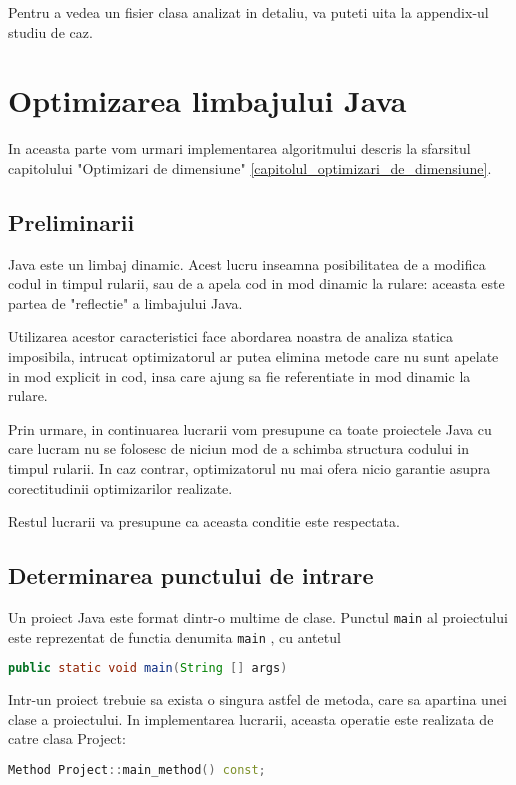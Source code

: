 Pentru a vedea un fisier clasa analizat in detaliu, va puteti
uita la appendix-ul studiu de caz.


\section{Optimizarea limbajului Java}

In aceasta parte vom urmari implementarea algoritmului descris la sfarsitul
capitolului "Optimizari de dimensiune" \ref{capitolul_optimizari_de_dimensiune}.

\subsection{Preliminarii}

Java este un limbaj dinamic. Acest lucru inseamna posibilitatea de a modifica
codul in timpul rularii, sau de a apela cod in mod dinamic la rulare: aceasta
este partea de "reflectie" a limbajului Java.

Utilizarea acestor caracteristici face abordarea noastra de analiza
statica imposibila, intrucat optimizatorul ar putea elimina metode care nu sunt
apelate in mod explicit in cod, insa care ajung sa fie referentiate in mod
dinamic la rulare.

Prin urmare, in continuarea lucrarii vom presupune ca toate proiectele Java cu
care lucram nu se folosesc de niciun mod de a schimba structura codului in
timpul rularii. In caz contrar, optimizatorul nu mai ofera nicio garantie asupra
corectitudinii optimizarilor realizate.

Restul lucrarii va presupune ca aceasta conditie este respectata.

\subsection{Determinarea punctului de intrare}

Un proiect Java este format dintr-o multime de clase.
Punctul \texttt{main} al proiectului este reprezentat de functia
denumita \texttt{main} \cite{java_main}, cu antetul

\begin{lstlisting}[language=Java]
public static void main(String [] args)
\end{lstlisting}

Intr-un proiect trebuie sa exista o singura astfel de metoda, care sa apartina
unei clase a proiectului.
In implementarea lucrarii, aceasta operatie este realizata de
catre clasa Project:
\begin{lstlisting}[language=C++]
Method Project::main_method() const;
\end{lstlisting}

